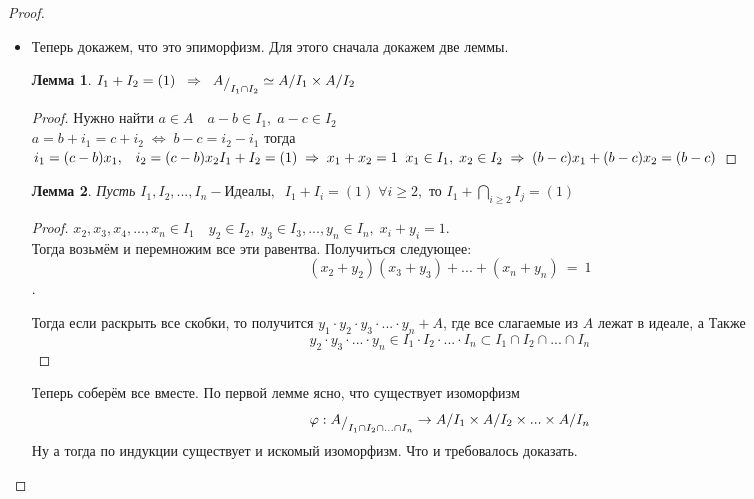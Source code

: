 \documentclass[12pt, a4paper]{article}
\newcommand{\lra}{\Leftrightarrow}
\newcommand{\ra}{\;\Rightarrow\;}
\theoremstyle{plain}
\newtheorem*{Lemma*}{Лемма}
\theoremstyle{definition}
\begin{document}
\begin{proof}
\begin{itemize}
        \item Теперь докажем, что это эпиморфизм. Для этого сначала докажем две леммы.
        \begin{Lemma*}
            $I_1+I_2 = (1)\; \ra \; A\raisebox{-.5ex}{$/$}_{I_1\cap I_2} \simeq A/I_1\times A/I_2$
        \end{Lemma*}
        \begin{proof}
            Нужно найти $a\in A\quad a-b\in I_1,\; a-c\in I_2$\\
            $a=b+i_1=c+i_2\; \lra \; b-c = i_2-i_1$ тогда \(i_1 = (c-b)x_1, \;\;\; i_2 = (c-b)x_2\\
            I_1+I_2 = (1)\ra x_1+x_2 = 1\;\; x_1\in I_1,\; x_2\in I_2\ra (b-c)x_1+(b-c)x_2 = (b-c)\)
        \end{proof}
        \begin{Lemma*}
            Пусть \(I_1,I_2,...,I_n - \text{Идеалы}, \;\; I_1+I_i = (1)\;\forall i\geqslant 2,\text{ то } I_1+\bigcap\limits_{i\geqslant 2}I_j = (1)\)
        \end{Lemma*}
        \begin{proof}
            \(x_2,x_3,x_4,...,x_n\in I_1\quad y_2\in I_2,\; y_3\in I_3,...,y_n\in I_n,\; x_i+y_i = 1\).\\ 

            Тогда возьмём и перемножим все эти равентва. Получиться следующее:
            \[(x_2+y_2)(x_3+y_3)+...+(x_n+y_n) \ = \ 1 \].
            
            Тогда если раскрыть все скобки, то получится $y_1\cdot y_2\cdot y_3\cdot...\cdot y_n+A$, где все слагаемые из $A$ лежат в идеале, а Также
            \[y_2\cdot y_3\cdot...\cdot y_n\in I_1\cdot I_2\cdot...\cdot I_n\subset I_1\cap I_2\cap...\cap I_n\]

        \end{proof}
        Теперь соберём все вместе. По первой лемме ясно, что существует изоморфизм  \[\varphi:A\raisebox{-0.5ex}{$/$}_{I_1\cap I_2\cap ... \cap I_n}\to A/I_1\times A/I_2\times...\times A/I_n\]
        Ну а тогда по индукции существует и искомый изоморфизм. Что и требовалось доказать.
    \end{itemize}
\end{proof}
\end{document}
